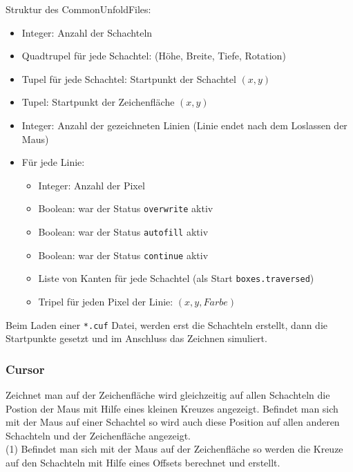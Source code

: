 Struktur des CommonUnfoldFiles:

\begin{itemize}
\item Integer: Anzahl der Schachteln
\item Quadtrupel für jede Schachtel: (Höhe, Breite, Tiefe, Rotation)
\item Tupel für jede Schachtel: Startpunkt der Schachtel $(x,y)$
\item Tupel: Startpunkt der Zeichenfläche $(x,y)$
\item Integer: Anzahl der gezeichneten Linien (Linie endet nach dem Loslassen der Maus)
\item Für jede Linie:
  \begin{itemize}
    \item Integer: Anzahl der Pixel
    \item Boolean: war der Status \texttt{overwrite} aktiv
    \item Boolean: war der Status \texttt{autofill} aktiv
    \item Boolean: war der Status \texttt{continue} aktiv
    \item Liste von Kanten für jede Schachtel (als Start \texttt{boxes.traversed})
    \item Tripel für jeden Pixel der Linie: $(x, y, Farbe)$
  \end{itemize}
\end{itemize}

Beim Laden einer \texttt{*.cuf} Datei, werden erst die Schachteln erstellt, dann die Startpunkte gesetzt und im Anschluss das Zeichnen simuliert.


\subsubsection{Cursor}
\label{subsubsec:cursor}

Zeichnet man auf der Zeichenfläche wird gleichzeitig auf allen Schachteln die Postion der Maus mit Hilfe eines kleinen Kreuzes angezeigt. Befindet man sich mit der Maus auf einer Schachtel so wird auch diese Position auf allen anderen Schachteln und der Zeichenfläche angezeigt.\\

(1) Befindet man sich mit der Maus auf der Zeichenfläche so werden die Kreuze auf den Schachteln mit Hilfe eines Offsets berechnet und erstellt.

